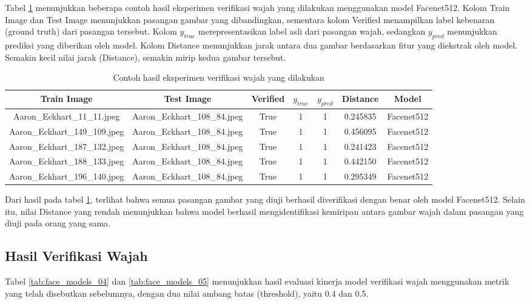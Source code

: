 \documentclass[a4paper, 11pt]{article}
\begin{document}
Tabel \ref{tab:face_verification} menunjukkan beberapa contoh hasil eksperimen verifikasi wajah yang dilakukan menggunakan model Facenet512. Kolom Train Image dan Test Image menunjukkan pasangan gambar yang dibandingkan, sementara kolom Verified menampilkan label kebenaran (ground truth) dari pasangan tersebut. Kolom $y_{true}$ merepresentasikan label asli dari pasangan wajah, sedangkan $y_{pred}$ menunjukkan prediksi yang diberikan oleh model. Kolom Distance menunjukkan jarak antara dua gambar berdasarkan fitur yang diekstrak oleh model. Semakin kecil nilai jarak (Distance), semakin mirip kedua gambar tersebut.
\begin{table}[h]
    \centering
    \begin{tabular}{|c|c|c|c|c|c|c|}
        \hline
        Train Image & Test Image & Verified & $y_{true}$ & $y_{pred}$ & Distance & Model \\
        \hline
        Aaron\_Eckhart\_11\_11.jpeg & Aaron\_Eckhart\_108\_84.jpeg & True & 1 & 1 & 0.245835 & Facenet512 \\
        Aaron\_Eckhart\_149\_109.jpeg & Aaron\_Eckhart\_108\_84.jpeg & True & 1 & 1 & 0.456095 & Facenet512 \\
        Aaron\_Eckhart\_187\_132.jpeg & Aaron\_Eckhart\_108\_84.jpeg & True & 1 & 1 & 0.241423 & Facenet512 \\
        Aaron\_Eckhart\_188\_133.jpeg & Aaron\_Eckhart\_108\_84.jpeg & True & 1 & 1 & 0.442150 & Facenet512 \\
        Aaron\_Eckhart\_196\_140.jpeg & Aaron\_Eckhart\_108\_84.jpeg & True & 1 & 1 & 0.295349 & Facenet512 \\
        \hline
    \end{tabular}
    \caption{Contoh hasil eksperimen verifikasi wajah yang dilakukan}
    \label{tab:face_verification}
\end{table}

Dari hasil pada tabel \ref{tab:face_verification}, terlihat bahwa semua pasangan gambar yang diuji berhasil diverifikasi dengan benar oleh model Facenet512. Selain itu, nilai Distance yang rendah menunjukkan bahwa model berhasil mengidentifikasi kemiripan antara gambar wajah dalam pasangan yang diuji pada orang yang sama.

\subsection{Hasil Verifikasi Wajah}

Tabel \ref{tab:face_models_04} dan  \ref{tab:face_models_05} menunjukkan hasil evaluasi kinerja model verifikasi wajah menggunakan metrik yang telah disebutkan sebelumnya, dengan dua nilai ambang batas (threshold), yaitu 0.4 dan 0.5.
\end{document}
